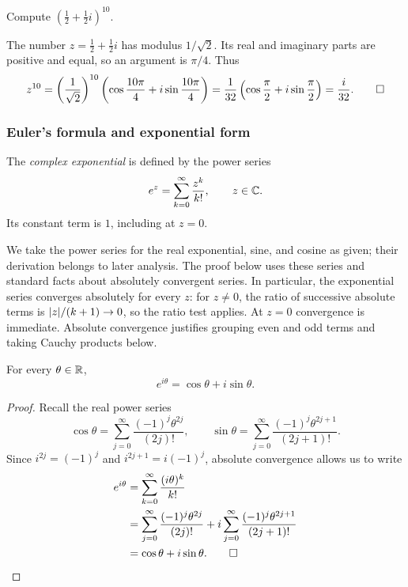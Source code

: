 \documentclass[11pt,a4paper]{amsart}
\begin{document}
\begin{example}
  Compute \(\left(\frac12+\frac12i\right)^{10}\).
\end{example}

\begin{solution}
  The number \(z=\frac12+\frac12i\) has modulus \(1/\sqrt2\).
  Its real and imaginary parts are positive and equal, so an argument
  is \(\pi/4\). Thus
  \[
    z^{10}=\left(\frac1{\sqrt2}\right)^{10}
    \left(\cos\frac{10\pi}{4}+i\sin\frac{10\pi}{4}\right)
    =\frac1{32}\left(\cos\frac\pi2+i\sin\frac\pi2\right)
    =\frac{i}{32}.\qedhere
  \]
\end{solution}

\subsubsection{Euler's formula and exponential form}

\begin{definition}
  The \emph{complex exponential} is defined by the power series
  \[
    e^z=\sum_{k=0}^{\infty}\frac{z^k}{k!},\qquad z\in\mathbb{C}.
  \]
  Its constant term is \(1\), including at \(z=0\).
\end{definition}

\begin{remark}
  We take the power series for the real exponential, sine,
  and cosine as given; their derivation belongs to later analysis.
  The proof below uses these series and standard facts about absolutely
  convergent series. In particular, the exponential series converges
  absolutely for every \(z\): for \(z\neq0\), the ratio of successive
  absolute terms is \(\lvert z\rvert/(k+1)\to0\), so the ratio test applies.
  At \(z=0\) convergence is immediate. Absolute convergence justifies
  grouping even and odd terms and taking Cauchy products below.
\end{remark}

\begin{theorem}
  For every \(\theta\in\mathbb{R}\),
  \[
    e^{i\theta}=\cos\theta+i\sin\theta.
  \]
\end{theorem}

\begin{proof}
  Recall the real power series
  \[
    \cos\theta=\sum_{j=0}^{\infty}\frac{(-1)^j\theta^{2j}}{(2j)!},
    \qquad
    \sin\theta=\sum_{j=0}^{\infty}\frac{(-1)^j\theta^{2j+1}}{(2j+1)!}.
  \]
  Since \(i^{2j}=(-1)^j\) and \(i^{2j+1}=i(-1)^j\), absolute
  convergence allows us to write
  \begin{align*}
    e^{i\theta}
    &=\sum_{k=0}^{\infty}\frac{(i\theta)^k}{k!}\\
    &=\sum_{j=0}^{\infty}\frac{(-1)^j\theta^{2j}}{(2j)!}
    +i\sum_{j=0}^{\infty}\frac{(-1)^j\theta^{2j+1}}{(2j+1)!}\\
    &=\cos\theta+i\sin\theta.\qedhere
  \end{align*}
\end{proof}
\end{document}
